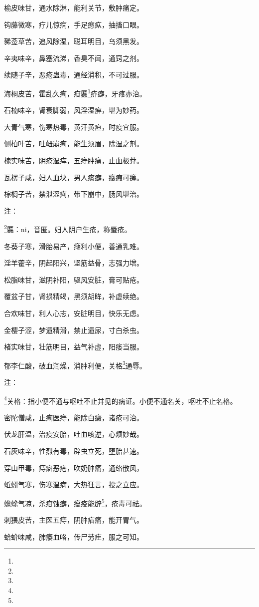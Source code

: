 \documentclass[a4paper,12pt,UTF8,twoside]{ctexbook}
\begin{document}
榆皮味甘，通水除淋，能利关节，敷肿痛定。

钩藤微寒，疗儿惊痫，手足瘛疭，抽搐口眼。

豨莶草苦，追风除湿，聪耳明目，乌须黑发。

辛夷味辛，鼻塞流涕，香臭不闻，通窍之剂。

续随子辛，恶疮蛊毒，通经消积，不可过服。

海桐皮苦，霍乱久痢，疳䘌\footnote{}疥癖，牙疼亦治。

石楠味辛，肾衰脚弱，风淫湿痹，堪为妙药。

大青气寒，伤寒热毒，黄汗黄疸，时疫宜服。

侧柏叶苦，吐衄崩痢，能生须眉，除湿之剂。

槐实味苦，阴疮湿痒，五痔肿痛，止血极莽。

瓦楞子咸，妇人血块，男人痰癖，癥瘕可瘥。

棕榈子苦，禁泄涩痢，带下崩中，肠风堪治。

注：

\footnote{}䘌：ni，音匿。妇人阴户生疮，称蜃疮。

冬葵子寒，滑胎易产，癃利小便，善通乳难。

淫羊藿辛，阴起阳兴，坚筋益骨，志强力增。

松脂味甘，滋阴补阳，驱风安脏，膏可贴疮。

覆盆子甘，肾损精竭，黑须胡眸，补虚续绝。

合欢味甘，利人心志，安脏明目，快乐无虑。

金樱子涩，梦遗精滑，禁止遗尿，寸白杀虫。

楮实味甘，壮筋明目，益气补虚，阳痿当服。

郁李仁酸，破血润燥，消肿利便，关格\footnote{}通辱。

注：

\footnote{}关格：指小便不通与呕吐不止并见的病证。小便不通名关，呕吐不止名格。

密陀僧咸，止痢医痔，能除白癜，诸疮可治。

伏龙肝温，治疫安胎，吐血咳逆，心烦妙哉。

石灰味辛，性烈有毒，辟虫立死，堕胎甚速。

穿山甲毒，痔癖恶疮，吹奶肿痛，通络散风，

蚯蚓气寒，伤寒温病，大热狂言，投之立应。

蟾蜍气凉，杀疳蚀癖，瘟疫能辟\footnote{}，疮毒可祛。

刺猥皮苦，主医五痔，阴肿疝痛，能开胃气。

蛤蚧味咸，肺痿血咯，传尸劳疰，服之可知。
\end{document}
